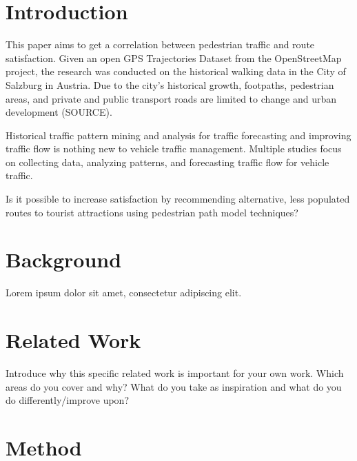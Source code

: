 

\section{Introduction}
\label{section:Introduction}

This paper aims to get a correlation between pedestrian traffic and route satisfaction. Given an open GPS Trajectories Dataset from the OpenStreetMap project, the research was conducted on the historical walking data in the City of Salzburg in Austria. Due to the city's historical growth, footpaths, pedestrian areas, and private and public transport roads are limited to change and urban development (SOURCE). 

\autocite[]{Netsch2021}

Historical traffic pattern mining and analysis for traffic forecasting and improving traffic flow is nothing new to vehicle traffic management. Multiple studies focus on collecting data, analyzing patterns, and forecasting traffic flow for vehicle traffic. 

Is it possible to increase satisfaction by recommending alternative, less populated routes to tourist attractions using pedestrian path model techniques?


\section{Background}
Lorem ipsum dolor sit amet, consectetur adipiscing elit. 

\section{Related Work}
Introduce why this specific related work is important for your own work. Which areas do you cover and why? What do you take as inspiration and what do you do differently/improve upon? 

\autocite[]{Sevtsuk2021}

\autocite[]{Delling2012}
\autocite[]{Hashemi2017}
\autocite[]{Qiu2015}
\autocite[]{Hendawi2019}
\autocite[]{Huber2016}

\section{Method}

